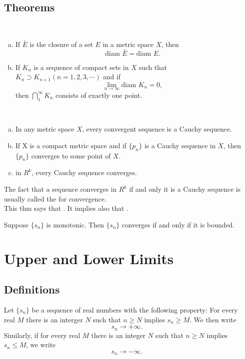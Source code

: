 \subsection{Theorems}
\begin{thm}
	~
	\begin{enumerate}[(a)]
		\item If $\bar E$ is the closure of a set $E$ in a metric space $X$, then $$\text{diam } \bar E = \text{diam }E.$$
		\item If $K_n$ is a sequence of compact sets in $X$ such that $K_n \supset K_{n+1} (n=1,2,3,\cdots)$ and if $$\lim_{n \to \infty} \text{diam } K_n =0,$$ then $\bigcap_1^\infty K_n$ consists of exactly one point.
	\end{enumerate}
\end{thm}

\begin{thm}
	~
	\begin{enumerate}[(a)]
		\item In any metric space $X$, every convergent sequence is a Cauchy sequence.
		\item If X is a compact metric space and if $\{p_n\}$ is a Cauchy sequence in $X$, then $\{p_n\}$ converges to some point of $X$.
		\item in $R^k$, every Cauchy sequence converges.
	\end{enumerate}
	The fact that a sequence converges in $R^k$ if and only it is a Cauchy sequence is usually called the {} for convergence.\\
	This thm says that {}. It implies also that {}.
\end{thm}

\begin{thm}
	Suppose $\{s_n\}$ is monotonic. Then $\{s_n\}$ converges if and only if it is bounded.
\end{thm}

\section{Upper and Lower Limits}
\subsection{Definitions}
\begin{deff}
	Let $\{s_n\}$ be a sequence of real numbers with the following property: For every real $M$ there is an interger $N$ such that $n\geq N$ implies $s_n \geq M$. We then write $$s_n\to+\infty.$$ Similarly, if for every real $M$ there is an integer $N$ such that $n\geq N$ implies $s_n\leq M$, we write $$s_n\to-\infty.$$
\end{deff}

